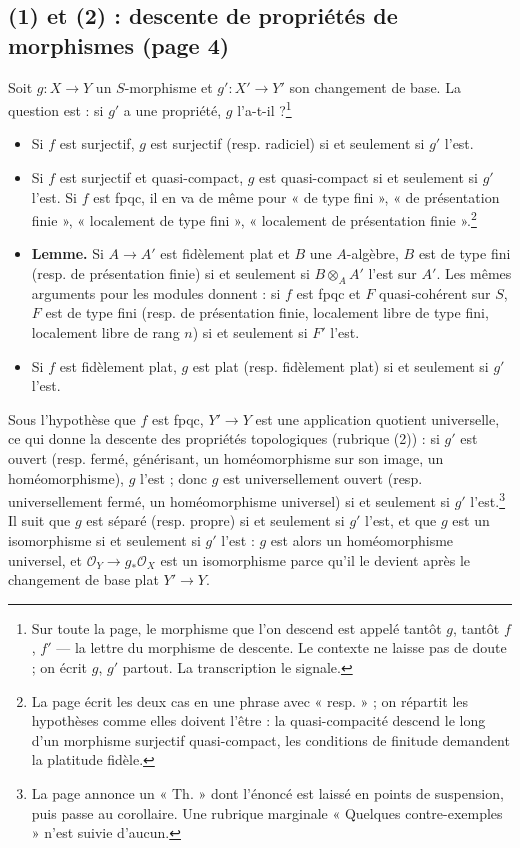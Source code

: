 \documentclass[11pt,a4paper]{article}
\begin{document}
\subsection*{(1) et (2) : descente de propriétés de morphismes (page 4)}

Soit $g : X \to Y$ un $S$-morphisme et $g' : X' \to Y'$ son changement de base.
La question est : si $g'$ a une propriété, $g$ l'a-t-il ?\footnote{Sur toute la
page, le morphisme que l'on descend est appelé tantôt $g$, tantôt $f$, $f'$ ---
la lettre du morphisme de descente. Le contexte ne laisse pas de doute ; on écrit
$g$, $g'$ partout. La transcription le signale.}

\begin{itemize}
  \item Si $f$ est surjectif, $g$ est surjectif (resp. radiciel) si et seulement
  si $g'$ l'est.
  \item Si $f$ est surjectif et quasi-compact, $g$ est quasi-compact si et
  seulement si $g'$ l'est. Si $f$ est fpqc, il en va de même pour
  « de type fini », « de présentation finie », « localement de type fini »,
  « localement de présentation finie ».\footnote{La page écrit les deux cas en
  une phrase avec « resp. » ; on répartit les hypothèses comme elles doivent
  l'être : la quasi-compacité descend le long d'un morphisme surjectif
  quasi-compact, les conditions de finitude demandent la platitude fidèle.}
  \item \textbf{Lemme.} Si $A \to A'$ est fidèlement plat et $B$ une
  $A$-algèbre, $B$ est de type fini (resp. de présentation finie) si et
  seulement si $B \otimes_A A'$ l'est sur $A'$. Les mêmes arguments pour les
  modules donnent : si $f$ est fpqc et $F$ quasi-cohérent sur $S$, $F$ est de
  type fini (resp. de présentation finie, localement libre de type fini,
  localement libre de rang $n$) si et seulement si $F'$ l'est.
  \item Si $f$ est fidèlement plat, $g$ est plat (resp. fidèlement plat) si et
  seulement si $g'$ l'est.
\end{itemize}

Sous l'hypothèse que $f$ est fpqc, $Y' \to Y$ est une application quotient
universelle, ce qui donne la descente des propriétés topologiques (rubrique
(2)) : si $g'$ est ouvert (resp. fermé, générisant, un homéomorphisme sur son
image, un homéomorphisme), $g$ l'est ; donc $g$ est universellement ouvert
(resp. universellement fermé, un homéomorphisme universel) si et seulement si
$g'$ l'est.\footnote{La page annonce un « Th. » dont l'énoncé est laissé en
points de suspension, puis passe au corollaire. Une rubrique marginale
« Quelques contre-exemples » n'est suivie d'aucun.} Il suit que $g$ est séparé
(resp. propre) si et seulement si $g'$ l'est, et que $g$ est un isomorphisme si
et seulement si $g'$ l'est : $g$ est alors un homéomorphisme universel, et
$\mathcal{O}_Y \to g_*\mathcal{O}_X$ est un isomorphisme parce qu'il le devient
après le changement de base plat $Y' \to Y$.
\end{document}
